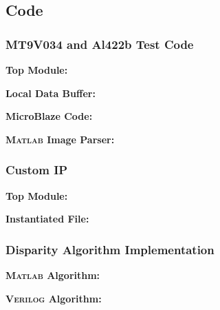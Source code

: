 \subsection{Code}

\subsubsection{MT9V034 and Al422b Test Code} \label{mt9v034TestCode}
\textbf{Top Module:}
\singlespacing

\doublespacing
\par
\textbf{Local Data Buffer:}
\singlespacing

\doublespacing
\par
\textbf{MicroBlaze Code:}
\label{camTestC}
\singlespacing

\doublespacing
\par
\textbf{\textsc{Matlab} Image Parser:}
\label{camTestMatlab}
\singlespacing

\doublespacing

\subsubsection{Custom IP} 
\textbf{Top Module:} \label{customIPtop}
\singlespacing

\doublespacing

\par
\textbf{Instantiated File:} \label{customIPaxi}
\singlespacing

\doublespacing

\subsubsection{Disparity Algorithm Implementation} \label{disparityTestMatlab}
\textbf{\textsc{Matlab} Algorithm:}
\singlespacing

\doublespacing

\par
\textbf{\textsc{Verilog} Algorithm:}
\singlespacing

\doublespacing